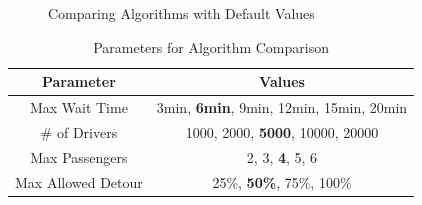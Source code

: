 \begin{figure}[]
    \centering
    \vspace{-0.15in}
    \caption{Comparing Algorithms with Default Values}
    \label{fig:defaults}
\end{figure}

\begin{table}
\begin{center}
\begin{tabular}{|c|c|}
	\hline
	Parameter & Values \\
	\hline \hline
	Max Wait Time & 3min, \textbf{6min}, 9min, 12min, 15min, 20min \\ 
	\hline
	\# of Drivers & 1000, 2000, \textbf{5000},  10000, 20000\\ 
	\hline
	Max Passengers & 2, 3, \textbf{4}, 5, 6 \\
	\hline
	Max Allowed Detour & 25\%, \textbf{50\%}, 75\%, 100\%\\
	\hline
\end{tabular}
\caption{Parameters for Algorithm Comparison}
\label{tab:params}
\end{center}
\end{table}

